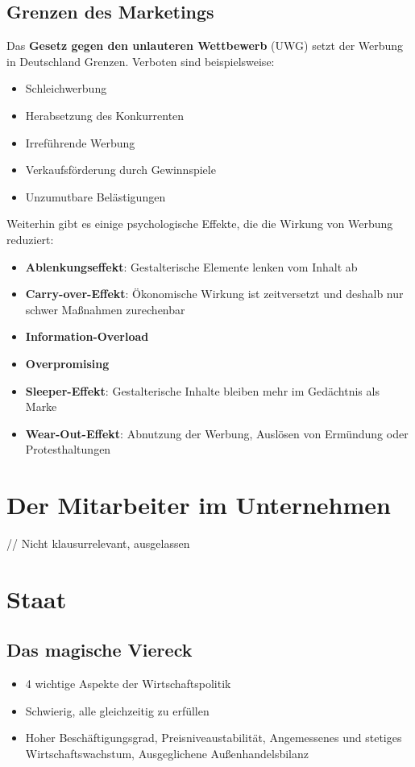 \documentclass[titlepage,parskip=half]{scrartcl}
\let\Section\section
\renewcommand\section{\clearpage\Section}
\begin{document}
\subsection{Grenzen des Marketings}
Das \textbf{Gesetz gegen den unlauteren Wettbewerb} (UWG) setzt der Werbung in Deutschland Grenzen. Verboten sind beispielsweise:
\begin{itemize}
    \item Schleichwerbung
    \item Herabsetzung des Konkurrenten
    \item Irreführende Werbung
    \item Verkaufsförderung durch Gewinnspiele
    \item Unzumutbare Belästigungen
\end{itemize}

Weiterhin gibt es einige psychologische Effekte, die die Wirkung von Werbung reduziert:
\begin{itemize}
    \item \textbf{Ablenkungseffekt}: Gestalterische Elemente lenken vom Inhalt ab
    \item \textbf{Carry-over-Effekt}: Ökonomische Wirkung ist zeitversetzt und deshalb nur schwer Maßnahmen zurechenbar
    \item \textbf{Information-Overload}
    \item \textbf{Overpromising}
    \item \textbf{Sleeper-Effekt}: Gestalterische Inhalte bleiben mehr im Gedächtnis als Marke
    \item \textbf{Wear-Out-Effekt}: Abnutzung der Werbung, Auslösen von Ermündung oder Protesthaltungen
\end{itemize}

\section{Der Mitarbeiter im Unternehmen}
// Nicht klausurrelevant, ausgelassen

\section{Staat}
\subsection{Das magische Viereck}
\begin{itemize}
    \item 4 wichtige Aspekte der Wirtschaftspolitik
    \item Schwierig, alle gleichzeitig zu erfüllen
    \item Hoher Beschäftigungsgrad, Preisniveaustabilität, Angemessenes und stetiges Wirtschaftswachstum, Ausgeglichene Außenhandelsbilanz
\end{itemize}
\end{document}
